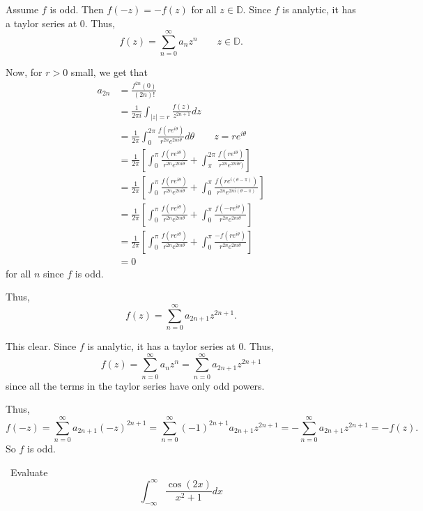 \documentclass[12pt]{Qual}
\begin{document}
\begin{solution}$\,$

\boxed{\implies} Assume $f$ is odd. Then $f(-z)=-f(z)$ for all $z\in\mathbb{D}$. Since $f$ is analytic, it has a taylor series at $0$. Thus, $$f(z)=\sum_{n=0}^\infty a_nz^n\qquad z\in\mathbb{D}.$$

Now, for $r>0$ small, we get that \begin{align*}
    a_{2n}&=\frac{f^{2n}(0)}{(2n)!}\\
    &=\frac{1}{2\pi i}\int_{|z|=r}\frac{f(z)}{z^{2n+1}}dz\\
    &=\frac{1}{2\pi}\int_0^{2\pi}\frac{f(re^{i\theta})}{r^{2n}e^{2ni\theta}}d\theta\qquad z=re^{i\theta}\\
    &=\frac{1}{2\pi}\left[\int_0^\pi\frac{f(re^{i\theta})}{r^{2n}e^{2ni\theta}}+\int_\pi^{2\pi}\frac{f(re^{i\theta})}{r^{2n}e^{2ni\theta})}\right]\\
    &=\frac{1}{2\pi}\left[\int_0^\pi\frac{f(re^{i\theta})}{r^{2n}e^{2ni\theta}}+\int_0^\pi\frac{f(re^{i(\theta-\pi)})}{r^{2n}e^{2ni(\theta-\pi)}}\right]\\
    &=\frac{1}{2\pi}\left[\int_0^\pi\frac{f(re^{i\theta})}{r^{2n}e^{2ni\theta}}+\int_0^\pi\frac{f(-re^{i\theta})}{r^{2n}e^{2ni\theta}}\right]\\
    &=\frac{1}{2\pi}\left[\int_0^\pi\frac{f(re^{i\theta})}{r^{2n}e^{2ni\theta}}+\int_0^\pi\frac{-f(re^{i\theta})}{r^{2n}e^{2ni\theta}}\right]\\
    &=0
\end{align*} for all $n$ since $f$ is odd.

Thus, $$f(z)=\sum_{n=0}^\infty a_{2n+1}z^{2n+1}.$$

\boxed{\impliedby} This clear. Since $f$ is analytic, it has a taylor series at $0$. Thus, $$f(z)=\sum_{n=0}^\infty a_nz^n=\sum_{n=0}^\infty a_{2n+1}z^{2n+1}$$ since all the terms in the taylor series have only odd powers.

Thus, $$f(-z)=\sum_{n=0}^\infty a_{2n+1}(-z)^{2n+1}=\sum_{n=0}^\infty (-1)^{2n+1}a_{2n+1}z^{2n+1}=-\sum_{n=0}^\infty a_{2n+1}z^{2n+1}=-f(z).$$ So $f$ is odd.
\end{solution}
\newpage




\begin{problem} $\,$
Evaluate $$\int_{-\infty}^\infty\frac{\cos(2x)}{x^2+1}dx$$
\end{problem}
\end{document}
